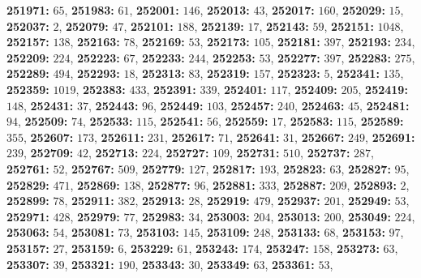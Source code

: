 \textsf{\bfseries 251971:} $65$, \textsf{\bfseries 251983:} $61$, \textsf{\bfseries 252001:} $146$, \textsf{\bfseries 252013:} $43$, \textsf{\bfseries 252017:} $160$, \textsf{\bfseries 252029:} $15$, \textsf{\bfseries 252037:} $2$, \textsf{\bfseries 252079:} $47$, \textsf{\bfseries 252101:} $188$, \textsf{\bfseries 252139:} $17$, \textsf{\bfseries 252143:} $59$, \textsf{\bfseries 252151:} $1048$, \textsf{\bfseries 252157:} $138$, \textsf{\bfseries 252163:} $78$, \textsf{\bfseries 252169:} $53$, \textsf{\bfseries 252173:} $105$, \textsf{\bfseries 252181:} $397$, \textsf{\bfseries 252193:} $234$, \textsf{\bfseries 252209:} $224$, \textsf{\bfseries 252223:} $67$, \textsf{\bfseries 252233:} $244$, \textsf{\bfseries 252253:} $53$, \textsf{\bfseries 252277:} $397$, \textsf{\bfseries 252283:} $275$, \textsf{\bfseries 252289:} $494$, \textsf{\bfseries 252293:} $18$, \textsf{\bfseries 252313:} $83$, \textsf{\bfseries 252319:} $157$, \textsf{\bfseries 252323:} $5$, \textsf{\bfseries 252341:} $135$, \textsf{\bfseries 252359:} $1019$, \textsf{\bfseries 252383:} $433$, \textsf{\bfseries 252391:} $339$, \textsf{\bfseries 252401:} $117$, \textsf{\bfseries 252409:} $205$, \textsf{\bfseries 252419:} $148$, \textsf{\bfseries 252431:} $37$, \textsf{\bfseries 252443:} $96$, \textsf{\bfseries 252449:} $103$, \textsf{\bfseries 252457:} $240$, \textsf{\bfseries 252463:} $45$, \textsf{\bfseries 252481:} $94$, \textsf{\bfseries 252509:} $74$, \textsf{\bfseries 252533:} $115$, \textsf{\bfseries 252541:} $56$, \textsf{\bfseries 252559:} $17$, \textsf{\bfseries 252583:} $115$, \textsf{\bfseries 252589:} $355$, \textsf{\bfseries 252607:} $173$, \textsf{\bfseries 252611:} $231$, \textsf{\bfseries 252617:} $71$, \textsf{\bfseries 252641:} $31$, \textsf{\bfseries 252667:} $249$, \textsf{\bfseries 252691:} $239$, \textsf{\bfseries 252709:} $42$, \textsf{\bfseries 252713:} $224$, \textsf{\bfseries 252727:} $109$, \textsf{\bfseries 252731:} $510$, \textsf{\bfseries 252737:} $287$, \textsf{\bfseries 252761:} $52$, \textsf{\bfseries 252767:} $509$, \textsf{\bfseries 252779:} $127$, \textsf{\bfseries 252817:} $193$, \textsf{\bfseries 252823:} $63$, \textsf{\bfseries 252827:} $95$, \textsf{\bfseries 252829:} $471$, \textsf{\bfseries 252869:} $138$, \textsf{\bfseries 252877:} $96$, \textsf{\bfseries 252881:} $333$, \textsf{\bfseries 252887:} $209$, \textsf{\bfseries 252893:} $2$, \textsf{\bfseries 252899:} $78$, \textsf{\bfseries 252911:} $382$, \textsf{\bfseries 252913:} $28$, \textsf{\bfseries 252919:} $479$, \textsf{\bfseries 252937:} $201$, \textsf{\bfseries 252949:} $53$, \textsf{\bfseries 252971:} $428$, \textsf{\bfseries 252979:} $77$, \textsf{\bfseries 252983:} $34$, \textsf{\bfseries 253003:} $204$, \textsf{\bfseries 253013:} $200$, \textsf{\bfseries 253049:} $224$, \textsf{\bfseries 253063:} $54$, \textsf{\bfseries 253081:} $73$, \textsf{\bfseries 253103:} $145$, \textsf{\bfseries 253109:} $248$, \textsf{\bfseries 253133:} $68$, \textsf{\bfseries 253153:} $97$, \textsf{\bfseries 253157:} $27$, \textsf{\bfseries 253159:} $6$, \textsf{\bfseries 253229:} $61$, \textsf{\bfseries 253243:} $174$, \textsf{\bfseries 253247:} $158$, \textsf{\bfseries 253273:} $63$, \textsf{\bfseries 253307:} $39$, \textsf{\bfseries 253321:} $190$, \textsf{\bfseries 253343:} $30$, \textsf{\bfseries 253349:} $63$, \textsf{\bfseries 253361:} $53$, 
